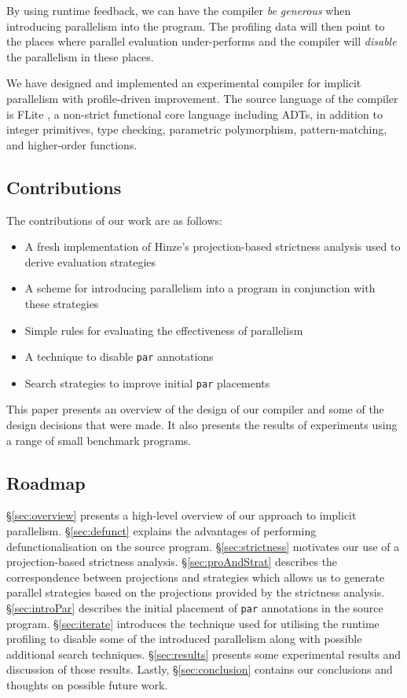 By using runtime feedback, we can have the compiler \emph{be generous} when
introducing parallelism into the program. The profiling data will then point to
the places where parallel evaluation under-performs and the compiler will
\emph{disable} the parallelism in these places. 


We have designed and implemented an experimental compiler for implicit
parallelism with profile-driven improvement. The source language of the
compiler is FLite \citep{naylor2010reduceron}, a non-strict functional core
language including ADTs, in addition to integer primitives, type checking,
parametric polymorphism, pattern-matching, and higher-order functions. 

\subsection{Contributions}

The contributions of our work are as follows:

\begin{itemize}
    \item A fresh implementation of Hinze's projection-based strictness analysis \citep{hinze1995projection}
        used to derive evaluation strategies
    \item A scheme for introducing parallelism into a program in conjunction with these
        strategies
    \item Simple rules for evaluating the effectiveness of parallelism
    \item A technique to disable \verb-par- annotations
    \item Search strategies to improve initial \verb-par- placements
\end{itemize}


This paper presents an overview of the design of our compiler and some of the
design decisions that were made.  It also presents the results of experiments
using a range of small benchmark programs.

\subsection{Roadmap}

\S\ref{sec:overview} presents a high-level overview of our approach to implicit
parallelism.  \S\ref{sec:defunct} explains the advantages of performing
defunctionalisation on the source program. \S\ref{sec:strictness} motivates our
use of a projection-based strictness analysis.  \S\ref{sec:proAndStrat}
describes the correspondence between projections and strategies which allows us
to generate parallel strategies based on the projections provided by the
strictness analysis. \S\ref{sec:introPar} describes the initial placement of
\verb-par- annotations in the source program. \S\ref{sec:iterate} introduces
the technique used for utilising the runtime profiling to disable some of the
introduced parallelism along with possible additional search techniques.
\S\ref{sec:results} presents some experimental results and discussion of those
results. Lastly, \S\ref{sec:conclusion} contains our conclusions and thoughts
on possible future work.

